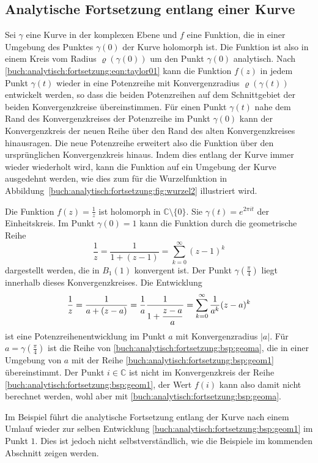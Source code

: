 %
%
%
\subsection{Analytische Fortsetzung entlang einer Kurve}
Sei $\gamma$ eine Kurve in der komplexen Ebene und $f$ eine
Funktion, die in einer Umgebung des Punktes $\gamma(0)$ der
Kurve holomorph ist.
Die Funktion ist also in einem Kreis vom Radius $\varrho(\gamma(0))$
um den Punkt $\gamma(0)$ analytisch.
Nach \eqref{buch:analytisch:fortsetzung:eqn:taylor01}
kann die Funktion $f(z)$ in jedem Punkt $\gamma(t)$ wieder in eine
Potenzreihe mit Konvergenzradius $\varrho(\gamma(t))$ entwickelt
werden, so dass die beiden Potenzreihen auf dem Schnittgebiet der
beiden Konvergenzkreise übereinstimmen.
Für einen Punkt $\gamma(t)$ nahe dem Rand des Konvergenzkreises 
der Potenzreihe im Punkt $\gamma(0)$ kann der Konvergenzkreis
der neuen Reihe über den Rand des alten Konvergenzkreises hinausragen.
Die neue Potenzreihe erweitert also die Funktion über den ursprünglichen
Konvergenzkreis hinaus.
Indem dies entlang der Kurve immer wieder wiederholt wird, kann die
Funktion auf ein Umgebung der Kurve ausgedehnt werden, wie dies zum
für die Wurzelfunktion in
Abbildung~\ref{buch:analytisch:fortsetzung:fig:wurzel2}
illustriert wird.

\begin{beispiel}
Die Funktion $f(z)=\frac{1}{z}$ ist holomorph in $\mathbb{C}\setminus\{0\}$.
Sie $\gamma(t)=e^{2\pi it}$ der Einheitskreis.
Im Punkt $\gamma(0)=1$ kann die Funktion durch die geometrische Reihe
\begin{equation}
\frac{1}{z}
=
\frac{1}{1+(z-1)}
=
\sum_{k=0}^\infty (z-1)^k
\label{buch:analytisch:fortsetzung:bsp:geom1}
\end{equation}
dargestellt werden, die in $B_1(1)$ konvergent ist.
Der Punkt $\gamma(\frac{\pi}4)$ liegt innerhalb dieses Konvergenzkreises.
Die Entwicklung
\begin{equation}
\frac{1}{z}
=
\frac{1}{a+(z-a)}
=
\frac1a \frac{1}{1+\displaystyle\frac{z-a\mathstrut}{a}}
=
\sum_{k=0}^\infty
\frac{1}{a^k}(z-a)^k
\label{buch:analytisch:fortsetzung:bsp:geoma}
\end{equation}
ist eine Potenzreihenentwicklung im Punkt $a$ mit Konvergenzradius $|a|$.
Für $a=\gamma(\frac{\pi}4)$ ist die Reihe von
\eqref{buch:analytisch:fortsetzung:bsp:geoma},
die in einer Umgebung von $a$ mit der Reihe
\eqref{buch:analytisch:fortsetzung:bsp:geom1}
übereinstimmt.
Der Punkt $i\in\mathbb{C}$ ist nicht im Konvergenzkreis der Reihe 
\eqref{buch:analytisch:fortsetzung:bsp:geom1},
der Wert $f(i)$ kann also damit nicht berechnet werden,
wohl aber mit
\eqref{buch:analytisch:fortsetzung:bsp:geoma}.
\end{beispiel}

Im Beispiel führt die analytische Fortsetzung entlang der Kurve 
nach einem Umlauf wieder zur selben Entwicklung
\eqref{buch:analytisch:fortsetzung:bsp:geom1}
im Punkt $1$.
Dies ist jedoch nicht selbstverständlich, wie die Beispiele
im kommenden Abschnitt zeigen werden.
